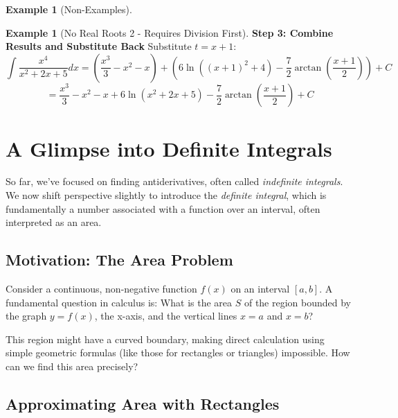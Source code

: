 \documentclass[11pt]{article}
\theoremstyle{plain}
\theoremstyle{definition}
\newtheorem{example}[theorem]{Example}
\theoremstyle{remark}
\begin{document}
\begin{example}[Non-Examples]
\begin{example}[No Real Roots 2 - Requires Division First]
\textbf{Step 3: Combine Results and Substitute Back}
Substitute $t=x+1$:
\[ \int \frac{x^4}{x^2+2x+5} dx = \left(\frac{x^3}{3} - x^2 - x\right) + \left(6 \ln((x+1)^2+4) - \frac{7}{2} \arctan\left(\frac{x+1}{2}\right)\right) + C \]
\[ = \frac{x^3}{3} - x^2 - x + 6 \ln(x^2+2x+5) - \frac{7}{2} \arctan\left(\frac{x+1}{2}\right) + C \]
\end{example}

\section{A Glimpse into Definite Integrals}

So far, we've focused on finding antiderivatives, often called \emph{indefinite integrals}. We now shift perspective slightly to introduce the \emph{definite integral}, which is fundamentally a number associated with a function over an interval, often interpreted as an area.

\subsection{Motivation: The Area Problem}

Consider a continuous, non-negative function $f(x)$ on an interval $[a, b]$. A fundamental question in calculus is: What is the area $S$ of the region bounded by the graph $y=f(x)$, the x-axis, and the vertical lines $x=a$ and $x=b$?

This region might have a curved boundary, making direct calculation using simple geometric formulas (like those for rectangles or triangles) impossible. How can we find this area precisely?

\subsection{Approximating Area with Rectangles}


\end{example}
\end{document}
